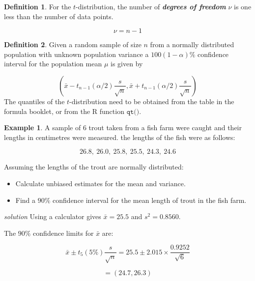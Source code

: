 \documentclass[
]{book}
\theoremstyle{definition}
\newtheorem{definition}{Definition}[chapter]
\theoremstyle{definition}
\newtheorem{example}{Example}[chapter]
\theoremstyle{definition}
\theoremstyle{definition}
\theoremstyle{remark}
\begin{document}
\begin{definition}
For the \(t\)-distribution, the number of \textbf{\emph{degrees of freedom}} \(\nu\) is one less than the number of data points.

\[\nu = n-1\]
\end{definition}

\begin{definition}
Given a random sample of size \(n\) from a normally distributed population with unknown population variance a \(100(1-\alpha)\%\) confidence interval for the population mean \(\mu\) is given by

\[\left( \bar{x} - t_{n-1}(\alpha /2) \frac{s}{\sqrt{n}}, \bar{x} + t_{n-1}(\alpha /2) \frac{s}{\sqrt{n}}\right)\]
The quantiles of the \(t\)-distribution need to be obtained from the table in the formula booklet, or from the R function \(\texttt{qt()}\).
\end{definition}

\begin{example}

A sample of \(6\) trout taken from a fish farm were caught and their lengths in centimetres were measured. the lengths of the fish were as follows:

\[ 26.8, \ 26.0, \ 25.8, \ 25.5, \ 24.3, \ 24.6 \]

Assuming the lengths of the trout are normally distributed:

\begin{itemize}
\item
  Calculate unbiased estimates for the mean and variance.
\item
  Find a \(90\%\) confidence interval for the mean length of trout in the fish farm.
\end{itemize}

\end{example}

\emph{solution}
Using a calculator gives \(\bar{x}=25.5\) and \(s^2 = 0.8560\).

The \(90\%\) confidence limits for \(\bar{x}\) are:

\[\bar{x} \pm t_{5}(5\%)\frac{s}{\sqrt{n}} = 25.5 \pm 2.015\times \frac{0.9252}{\sqrt{6}}\]

\[=(24.7,26.3)\]
\end{document}
